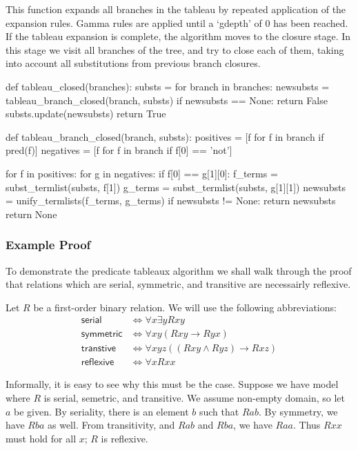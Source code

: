 \documentclass[a4paper,notitlepage]{scrartcl}
\begin{document}
This function expands all branches in the tableau by repeated application of
the expansion rules. Gamma rules are applied until a `gdepth' of 0 has been
reached. If the tableau expansion is complete, the algorithm moves to the
closure stage. In this stage we visit all branches of the tree, and try to
close each of them, taking into account all substitutions from previous branch
closures.

\begin{code}
def tableau_closed(branches):
    substs = {}
    for branch in branches:
        newsubsts = tableau_branch_closed(branch, substs)
        if newsubsts == None:
            return False
        substs.update(newsubsts)
    return True

def tableau_branch_closed(branch, substs):
    positives = [f for f in branch if pred(f)]
    negatives = [f for f in branch if f[0] == 'not']

    for f in positives:
        for g in negatives:
            if f[0] == g[1][0]:
                f_terms = subst_termlist(substs, f[1])
                g_terms = subst_termlist(substs, g[1][1])
                newsubsts = unify_termlists(f_terms, g_terms)
                if newsubsts != None:
                    return newsubsts
    return None
\end{code}

\subsubsection{Example Proof}

To demonstrate the predicate tableaux algorithm we shall walk through the
   proof that relations which are serial, symmetric, and transitive are
   necessairly reflexive.

Let $R$ be a first-order binary relation. 
We will use the following abbreviations:
\begin{align*}
\textsf{serial}& \iff \forall x\exists yRxy\\
\textsf{symmetric}& \iff \forall xy(Rxy\rightarrow Ryx)\\
\textsf{transtive}& \iff \forall xyz((Rxy\land Ryz)\rightarrow Rxz)\\
\textsf{reflexive}& \iff \forall x Rxx
\end{align*}

Informally, it is easy to see why this must be the case.
Suppose we have model where $R$ is serial, semetric, and transitive.
We assume non-empty domain, so let $a$ be given.
By seriality, there is an element $b$ such that $Rab$.
By symmetry, we have $Rba$ as well.
From transitivity, and $Rab$ and $Rba$, we have $Raa$.
Thus $Rxx$ must hold for all $x$; $R$ is reflexive.
\end{document}
